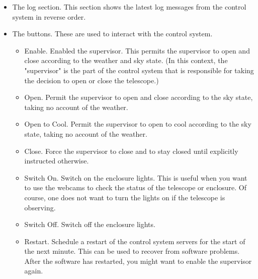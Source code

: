 \begin{itemize}
        Errors and warnings are shown here in red and yellow respectively.
    \item
        The log section. This section shows the latest log messages from the control system in reverse order.
    \item
        The buttons. These are used to interact with the control system.
        \begin{itemize}
            \item
                Enable. Enabled the supervisor. This permits the supervisor to open and close according to the weather and sky state. (In this context, the "supervisor" is the part of the control system that is responsible for taking the decision to open or close the telescope.)
            \item
                Open. Permit the supervisor to open and close according to the sky state, taking no account of the weather.
            \item
                Open to Cool. Permit the supervisor to open to cool according to the sky state, taking no account of the weather.
            \item
                Close. Force the supervisor to close and to stay closed until explicitly instructed otherwise.
                \label{interface-close-button}
            \item
                Switch On. Switch on the enclosure lights. This is useful when you want to use the webcams to check the status of the telescope or enclosure. Of course, one does not want to turn the lights on if the telescope is observing.
                \label{interface-switch-on-button}
            \item
                Switch Off. Switch off the enclosure lights.
                \label{interface-switch-off-button}

            \item
                Restart. Schedule a restart of the control system servers for the start of the next minute. This can be used to recover from software problems. After the software has restarted, you might want to enable the supervisor again.
                \label{interface-restart-button}

        \end{itemize}
\end{itemize}
